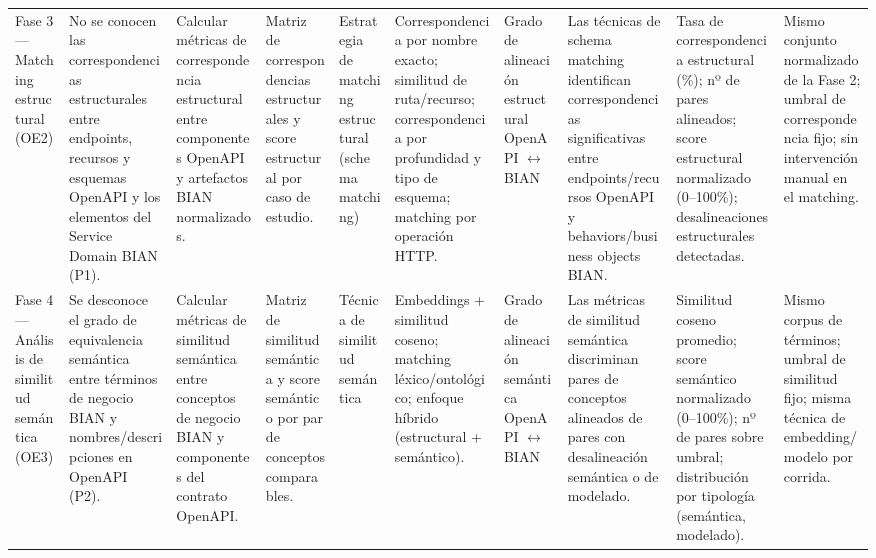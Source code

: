 \documentclass[10pt,landscape]{article}
\begin{document}
\begin{longtable}{@{} P{0.094\textwidth} P{0.094\textwidth} P{0.094\textwidth} P{0.094\textwidth} P{0.094\textwidth} P{0.094\textwidth} P{0.094\textwidth} P{0.094\textwidth} P{0.094\textwidth} P{0.094\textwidth} @{}}
Fase 3 — Matching estructural (OE2) & No se conocen las correspondencias estructurales entre endpoints, recursos y esquemas OpenAPI y los elementos del Service Domain BIAN (P1). & Calcular métricas de correspondencia estructural entre componentes OpenAPI y artefactos BIAN normalizados. & Matriz de correspondencias estructurales y score estructural por caso de estudio. & Estrategia de matching estructural (schema matching) & Correspondencia por nombre exacto; similitud de ruta/recurso; correspondencia por profundidad y tipo de esquema; matching por operación HTTP. & Grado de alineación estructural OpenAPI $\leftrightarrow$ BIAN & Las técnicas de schema matching identifican correspondencias significativas entre endpoints/recursos OpenAPI y behaviors/business objects BIAN. & Tasa de correspondencia estructural (\%); nº de pares alineados; score estructural normalizado (0–100\%); desalineaciones estructurales detectadas. & Mismo conjunto normalizado de la Fase 2; umbral de correspondencia fijo; sin intervención manual en el matching. \\
 Fase 4 — Análisis de similitud semántica (OE3) & Se desconoce el grado de equivalencia semántica entre términos de negocio BIAN y nombres/descripciones en OpenAPI (P2). & Calcular métricas de similitud semántica entre conceptos de negocio BIAN y componentes del contrato OpenAPI. & Matriz de similitud semántica y score semántico por par de conceptos comparables. & Técnica de similitud semántica & Embeddings + similitud coseno; matching léxico/ontológico; enfoque híbrido (estructural + semántico). & Grado de alineación semántica OpenAPI $\leftrightarrow$ BIAN & Las métricas de similitud semántica discriminan pares de conceptos alineados de pares con desalineación semántica o de modelado. & Similitud coseno promedio; score semántico normalizado (0–100\%); nº de pares sobre umbral; distribución por tipología (semántica, modelado). & Mismo corpus de términos; umbral de similitud fijo; misma técnica de embedding/modelo por corrida. \\

\end{longtable}
\end{document}
